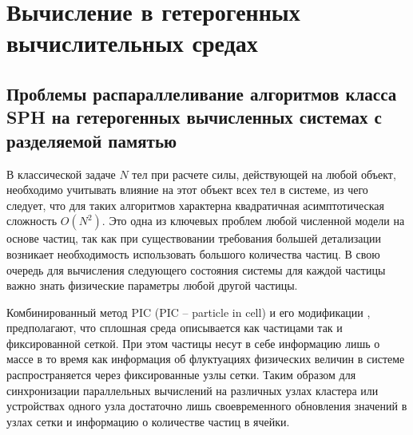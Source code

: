 \chapter{Вычисление в гетерогенных вычислительных средах}\label{ch:ch2}

\section{Проблемы распараллеливание алгоритмов класса SPH на гетерогенных вычисленных системах с разделяемой памятью}\label{sec:ch2/sec1}

В классической задаче \(N\) тел при расчете силы, действующей на любой объект, необходимо учитывать влияние на этот объект всех тел в системе, из чего следует, что для таких алгоритмов характерна квадратичная асимптотическая сложность \(O(N^2)\). Это одна из ключевых проблем любой численной модели на основе частиц, так как при существовании требования большей детализации возникает необходимость использовать большого количества частиц. В свою очередь для вычисления следующего состояния системы для каждой частицы важно знать физические параметры любой другой частицы.

Комбинированный метод PIC (PIC – particle in cell) \cite{Harlow1963, Grigoriev2000, Belocherkovsky1982} и его модификации \cite{Belocherkovsky1982}, предполагают, что сплошная среда описывается как частицами так и фиксированной сеткой. При этом частицы несут в себе информацию лишь о массе в то время как информация об флуктуациях физических величин в системе распространяется через фиксированные узлы сетки.
Таким образом для синхронизации параллельных вычислений на различных узлах кластера или устройствах одного узла достаточно лишь своевременного обновления значений в узлах сетки и информацию о количестве частиц в ячейки.

